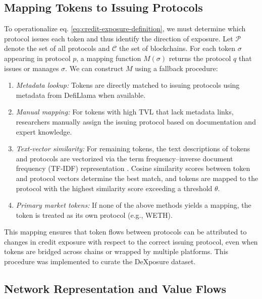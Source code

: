 \subsection{Mapping Tokens to Issuing Protocols}

To operationalize eq. \eqref{eq:credit-exposure-definition}, we must determine which protocol issues each token and thus identify the direction of exposure.  Let $\mathcal{P}$ denote the set of all protocols and $\mathcal{C}$ the set of blockchains.  For each token $\sigma$ appearing in protocol $p$, a {mapping function} $M(\sigma)$ returns the protocol $q$ that issues or manages $\sigma$.  We can construct $M$ using a fallback procedure:
\begin{enumerate}
  \item \emph{Metadata lookup:} Tokens are directly matched to issuing protocols using metadata from DefiLlama \citep{DefiLlama2026} when available.
  \item \emph{Manual mapping:} For tokens with high TVL that lack metadata links, researchers manually assign the issuing protocol based on documentation and expert knowledge.
  \item \emph{Text‑vector similarity:} For remaining tokens, the text descriptions of tokens and protocols are vectorized via the term frequency–inverse document frequency (TF-IDF) representation \cite{Qaiser2018}.  Cosine similarity scores between token and protocol vectors determine the best match, and tokens are mapped to the protocol with the highest similarity score exceeding a threshold $\theta$.
  \item \emph{Primary market tokens:} If none of the above methods yields a mapping, the token is treated as its own protocol (e.g., WETH).
\end{enumerate}
This mapping ensures that token flows between protocols can be attributed to changes in credit exposure with respect to the correct issuing protocol, even when tokens are bridged across chains or wrapped by multiple platforms. This procedure was implemented to curate the DeXposure dataset.

\subsection{Network Representation and Value Flows}

